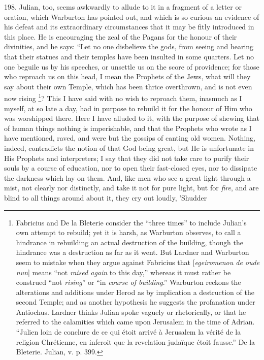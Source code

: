 198.
Julian, too, seems awkwardly to allude to it in a fragment of a letter
or oration, which Warburton has pointed out, and which is so curious
an evidence of his defeat and its extraordinary circumstances that it
may be fitly introduced in this place. He is encouraging the zeal of
the Pagans for the honour of their divinities, and he says: ``Let no one
disbelieve the gods, from seeing and hearing that their statues and
their temples have been insulted in some quarters. Let no one beguile
us by his speeches, or unsettle us on the score of providence; for
those who reproach us on this head, I mean the Prophets of the Jews,
what will they say about their own Temple, which has been thrice
overthrown, and is not even now rising \footnote{Fabricius and De la Bleterie consider the ``three times'' to include
Julian's own attempt to rebuild; yet it is harsh, as Warburton
observes, to call a hindrance in rebuilding an actual destruction of
the building, though the hindrance was a destruction as far as it
went. But Lardner and Warburton seem to mistake when they argue
against Fabricius that [\emph{egeiromenou de oude nun}] means ``not \emph{raised
again} to this day,'' whereas it must rather be construed ``not \emph{rising}''
or ``in \emph{course of building}.'' Warburton reckons the alterations
and additions under Herod as by implication a destruction of the
second Temple; and as another hypothesis he suggests the profanation
under Antiochus. Lardner thinks Julian spoke vaguely or rhetorically,
or that he referred to the calamities which came upon Jerusalem in the
time of Adrian. ``Julien loin de conclure de ce qui étoit arrivé à
Jerusalem la vérité de la religion Chrétienne, en inferoit que la
revelation judaïque étoit fausse.'' De la Bleterie. Julian, v.
p. 399.}? This I have said with no wish to reproach them, inasmuch as I myself, at so late a day, had in purpose to rebuild it for the
honour of Him who was worshipped there. Here I have alluded to it,
with the purpose of shewing that of human things nothing is
imperishable, and that the Prophets who wrote as I have mentioned,
raved, and were but the gossips of canting old women. Nothing, indeed,
contradicts the notion of that God being great, but He is unfortunate
in His Prophets and interpreters; I say that they did not take care to
purify their souls by a course of education, nor to open their
fast-closed eyes, nor to dissipate the darkness which lay on them.
And, like men who see a great light through a mist, not clearly nor
distinctly, and take it not for pure light, but for \emph{fire}, and
are blind to all things around about it, they cry out loudly, 'Shudder
